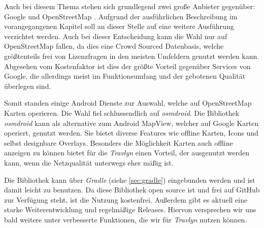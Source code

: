 Auch bei diesem Thema stehen sich grundlegend zwei große Anbieter gegenüber: Google \cite{Google.01.02.2020} und OpenStreetMap \cite{OpenStreetMap.}. Aufgrund der ausführlichen Beschreibung im vorangegangenen Kapitel soll an dieser Stelle auf eine weitere Ausführung verzichtet werden. Auch bei dieser Entscheidung kann die Wahl nur auf OpenStreetMap fallen, da dies eine Crowd Sourced Datenbasis, welche größtenteils frei von Lizenzfragen in den meisten Umfeldern genutzt werden kann. Abgesehen vom Kostenfaktor ist dies der größte Vorteil gegenüber Services von Google, die allerdings meist im Funktionsumfang und der gebotenen Qualität überlegen sind.

\vspace{0.25cm}

Somit standen einige Android Dienste zur Auswahl, welche auf OpenStreetMap Karten operieren. Die Wahl fiel schlussendlich auf \textit{osmdroid}\cite{osmdroid.3162020}. Die Bibliothek \textit{osmdroid} kann als alternative zum Android MapView, welcher auf Google Karten operiert, genutzt werden. Sie bietet diverse Features wie offline Karten, Icons und selbst designbare Overlays. Besonders die Möglichkeit Karten auch offline anzeigen zu können bietet für die \textit{Travlyn} einen Vorteil, der ausgenutzt werden kann, wenn die Netzqualität unterwegs eher mäßig ist.

\vspace{0.25cm}

Die Bibliothek kann über \textit{Gradle} (siehe \autoref{sec:gradle}) eingebunden werden und ist damit leicht zu benutzen. Da diese Bibliothek open source ist und frei auf GitHub zur Verfügung steht, ist die Nutzung kostenfrei. Außerdem gibt es aktuell eine starke Weiterentwicklung und regelmäßige Releases. Hiervon versprechen wir uns bald weitere unter verbesserte Funktionen, die wir für \textit{Travlyn} nutzen können.